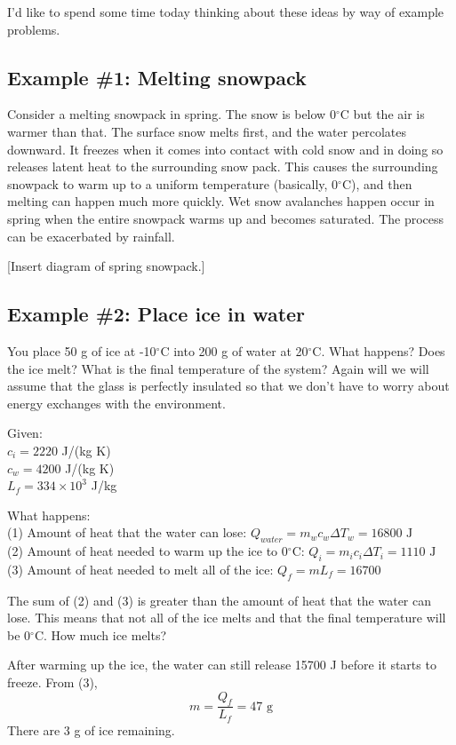 I'd like to spend some time today thinking about these ideas by way of example problems.

\subsection{Example \#1: Melting snowpack}
Consider a melting snowpack in spring. The snow is below 0$^\circ$C but the air is warmer than that. The surface snow melts first, and the water percolates downward. It freezes when it comes into contact with cold snow and in doing so releases latent heat to the surrounding snow pack. This causes the surrounding snowpack to warm up to a uniform temperature (basically, 0$^\circ$C), and then melting can happen much more quickly. Wet snow avalanches happen occur in spring when the entire snowpack warms up and becomes saturated. The process can be exacerbated by rainfall.


[Insert diagram of spring snowpack.]\nopagebreak
\vspace{5cm}

\subsection{Example \#2: Place ice in water}
You place 50 g of ice at -10$^\circ$C into 200 g of water at 20$^\circ$C. What happens? Does the ice melt? What is the final temperature of the system? Again will we will assume that the glass is perfectly insulated so that we don't have to worry about energy exchanges with the environment.

Given:\\
$c_i=2220$ J/(kg K)\\
$c_w=4200$ J/(kg K)\\
$L_f=334\times 10^3$ J/kg

What happens:\\
(1) Amount of heat that the water can lose: $Q_{water}=m_wc_w\Delta{T_w}=16800\mbox{ J}$\\
(2) Amount of heat needed to warm up the ice to 0$^\circ$C: $Q_i=m_ic_i\Delta{T_i}=1110\mbox{ J}$\\
(3) Amount of heat needed to melt all of the ice: $Q_f=mL_f=16700$

The sum of (2) and (3) is greater than the amount of heat that the water can lose. This means that not all of the ice melts and that the final temperature will be 0$^\circ$C. How much ice melts?

After warming up the ice, the water can still release 15700 J before it starts to freeze. From (3),
$$m=\frac{Q_f}{L_f}=47\mbox{ g}$$
There are 3 g of ice remaining.

